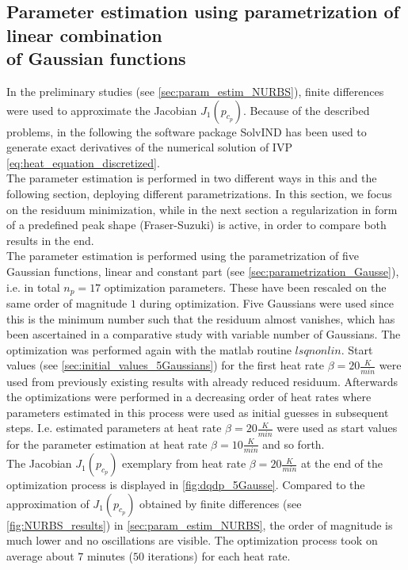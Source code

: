 \documentclass{scrartcl}[12pt, halfparskip]
\numberwithin{equation}{section}
\numberwithin{figure}{section}
\numberwithin{table}{section}
\begin{document}
\subsection{Parameter estimation using parametrization of linear combination \\ \hspace{0.85cm} of Gaussian functions}
\label{sec:param_estimation_5Gausse}
In the preliminary studies (see \cref{sec:param_estim_NURBS}), finite differences were used to approximate the Jacobian $J_1(p_{c_p})$. 
Because of the described problems, in the following the software package SolvIND has been used to generate exact derivatives of the numerical solution of IVP \cref{eq:heat_equation_discretized}. \\
The parameter estimation is performed in two different ways in this and the following section, deploying different parametrizations. In this section, we focus on the residuum minimization, while in the next section a regularization in form of a predefined peak shape (Fraser-Suzuki) is active, in order to compare both results in the end. \\
The parameter estimation is performed using the parametrization of five Gaussian functions, linear and constant part (see \cref{sec:parametrization_Gausse}), i.e. in total $n_p=17$ optimization parameters. These have been rescaled on the same order of magnitude $1$ during optimization.
Five Gaussians were used since this is the minimum number such that the residuum almost vanishes, which has been ascertained in a comparative study with variable number of Gaussians. 
The optimization was performed again with the matlab routine $lsqnonlin$. Start values (see \cref{sec:initial_values_5Gaussians}) for the first heat rate $\beta = 20 \frac{K}{min}$ were used from previously existing results with already reduced residuum. 
Afterwards the optimizations were performed in a decreasing order of heat rates where parameters estimated in this process were used as initial guesses in subsequent steps. 
I.e. estimated parameters at heat rate $\beta=20 \frac{K}{min}$ were used as start values for the parameter estimation at heat rate $\beta=10 \frac{K}{min}$ and so forth. \\
The Jacobian $J_1(p_{c_p})$ exemplary from heat rate $\beta=20\frac{K}{min}$ at the end of the optimization process is displayed in \cref{fig:dqdp_5Gausse}. Compared to the approximation of $J_1(p_{c_p})$ obtained by finite differences (see \cref{fig:NURBS_results}) in \cref{sec:param_estim_NURBS}, the order of magnitude is much lower and no oscillations are visible.
The optimization process took on average about $7$ minutes ($50$ iterations) for each heat rate.
\end{document}
